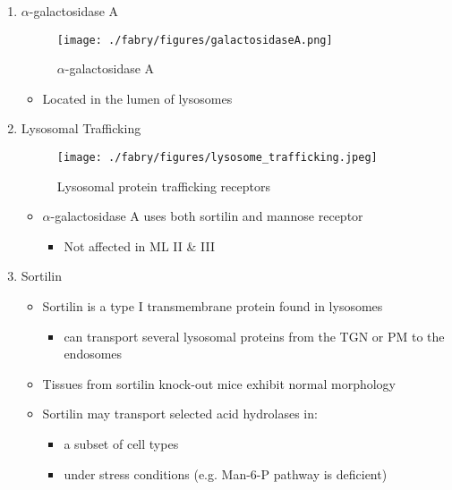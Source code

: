 \documentclass{scrartcl}
\begin{document}
\begin{enumerate}
\item \(\alpha\)-galactosidase A
\label{sec:org61a83e0}
\begin{figure}[htbp]
\centering
\texttt{[image: ./fabry/figures/galactosidaseA.png]}
\caption[\(\alpha\)-galactosidase A]{\label{fig:orgbb26264}
\(\alpha\)-galactosidase A}
\end{figure}

\begin{itemize}
\item Located in the lumen of lysosomes
\end{itemize}

\item Lysosomal Trafficking
\label{sec:orge6d3dcb}

\begin{figure}[htbp]
\centering
\texttt{[image: ./fabry/figures/lysosome\_trafficking.jpeg]}
\caption[Lysosomal protein trafficking receptors]{\label{fig:orga01d8f0}
Lysosomal protein trafficking receptors}
\end{figure}

\begin{itemize}
\item \(\alpha\)-galactosidase A uses both sortilin and mannose receptor
\begin{itemize}
\item Not affected in ML II \& III
\end{itemize}
\end{itemize}

\item Sortilin
\label{sec:orgd493607}

\begin{itemize}
\item Sortilin is a type I transmembrane protein found in lysosomes
\begin{itemize}
\item can transport several lysosomal proteins from the TGN or PM to the endosomes
\end{itemize}
\item Tissues from sortilin knock-out mice exhibit normal morphology
\item Sortilin may transport selected acid hydrolases in:
\begin{itemize}
\item a subset of cell types
\item under stress conditions (e.g. Man-6-P pathway is deficient)
\end{itemize}
\end{itemize}


\end{enumerate}
\end{document}
